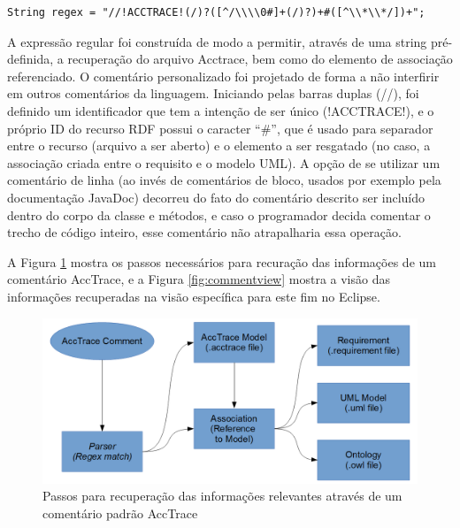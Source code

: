 \documentclass[runningheads,a4paper]{llncs}
\begin{document}
\medskip

\noindent
\begin{verbatim}
String regex = "//!ACCTRACE!(/)?([^/\\\\0#]+(/)?)+#([^\\*\\*/])+";
\end{verbatim}
%
\noindent

A expressão regular foi construída de modo a permitir, através de uma string pré-definida, a recuperação do arquivo Acctrace,
bem como do elemento de associação referenciado. O comentário personalizado foi projetado de forma a não interfirir em outros
comentários da linguagem. Iniciando pelas barras duplas (//), foi definido um
identificador que tem a intenção de ser único (!ACCTRACE!), e o próprio ID do recurso RDF possui o caracter ``\#'', que é usado para separador entre
o recurso (arquivo a ser aberto) e o elemento a ser resgatado (no caso, a
associação criada entre o requisito e o modelo UML). A opção de se
utilizar um comentário de linha (ao invés de comentários de bloco, usados por exemplo pela documentação JavaDoc) decorreu do fato
do comentário descrito ser incluído dentro do corpo da classe e métodos, e caso
o programador decida comentar o trecho de código inteiro, esse comentário não
atrapalharia essa operação.

A Figura \ref{fig:commentrecovery} mostra os passos necessários para recuração das informações de um comentário AccTrace, e a Figura \ref{fig:commentview}
mostra a visão das informações recuperadas na visão específica para este fim no Eclipse.

\begin{figure}[h!]
\centering
\includegraphics[scale=0.3]{./img/commentrecovery.png}
\caption{Passos para recuperação das informações relevantes através de um
comentário padrão AccTrace}
\label{fig:commentrecovery}
\end{figure} 
\end{document}
